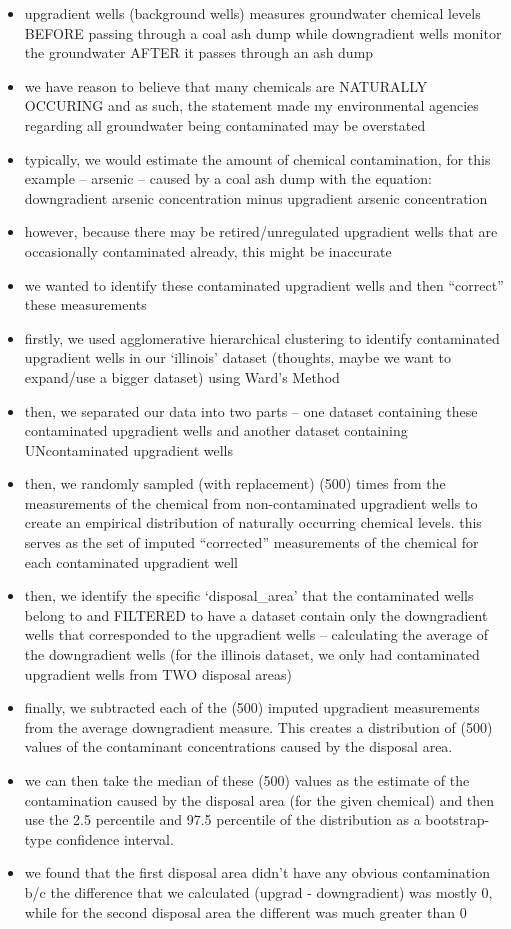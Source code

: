 \documentclass[12pt, twoside]{amherstthesis}
\begin{document}
\begin{itemize}
\item
  upgradient wells (background wells) measures groundwater chemical levels BEFORE passing through a coal ash dump while downgradient wells monitor the groundwater AFTER it passes through an ash dump
\item
  we have reason to believe that many chemicals are NATURALLY OCCURING and as such, the statement made my environmental agencies regarding all groundwater being contaminated may be overstated
\item
  typically, we would estimate the amount of chemical contamination, for this example -- arsenic -- caused by a coal ash dump with the equation: downgradient arsenic concentration minus upgradient arsenic concentration
\item
  however, because there may be retired/unregulated upgradient wells that are occasionally contaminated already, this might be inaccurate
\item
  we wanted to identify these contaminated upgradient wells and then ``correct'' these measurements
\item
  firstly, we used agglomerative hierarchical clustering to identify contaminated upgradient wells in our `illinois' dataset (thoughts, maybe we want to expand/use a bigger dataset) using Ward's Method
\item
  then, we separated our data into two parts -- one dataset containing these contaminated upgradient wells and another dataset containing UNcontaminated upgradient wells
\item
  then, we randomly sampled (with replacement) (500) times from the measurements of the chemical from non-contaminated upgradient wells to create an empirical distribution of naturally occurring chemical levels. this serves as the set of imputed ``corrected'' measurements of the chemical for each contaminated upgradient well
\item
  then, we identify the specific `disposal\_area' that the contaminated wells belong to and FILTERED to have a dataset contain only the downgradient wells that corresponded to the upgradient wells -- calculating the average of the downgradient wells (for the illinois dataset, we only had contaminated upgradient wells from TWO disposal areas)
\item
  finally, we subtracted each of the (500) imputed upgradient measurements from the average downgradient measure. This creates a distribution of (500) values of the contaminant concentrations caused by the disposal area.
\item
  we can then take the median of these (500) values as the estimate of the contamination caused by the disposal area (for the given chemical) and then use the 2.5 percentile and 97.5 percentile of the distribution as a bootstrap-type confidence interval.
\item
  we found that the first disposal area didn't have any obvious contamination b/c the difference that we calculated (upgrad - downgradient) was mostly 0, while for the second disposal area the different was much greater than 0
\end{itemize}
\end{document}
